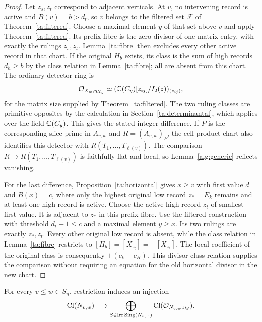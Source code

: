 \begin{proof}
Let $z_s,z_t$ correspond to adjacent verticals. At $v$, no intervening
record is active and $B(v)=b>d_t$, so $v$ belongs to
the filtered set $\mathcal F$ of Theorem~\ref{ta:filtered}. Choose a maximal element $y$ of that
set above $v$ and apply Theorem~\ref{ta:filtered}.
Its prefix fibre is the zero divisor of one matrix entry, with
exactly the rulings $z_s,z_t$. Lemma~\ref{ta:fibre} then excludes
every other active record in that chart. If the original $H_b$
exists, its class is the sum of high records $d_h\geq b$ by
the class relation in Lemma~\ref{ta:fibre}; all are absent from this chart.
The ordinary detector ring is
\[
 \mathcal O_{X_w,\eta_{X_y}}
 \simeq(\mathbb C(C_y)[z_{ij}]/I_2(z))_{(z_{ij})},
\]
for the matrix size supplied by Theorem~\ref{ta:filtered}.
The two ruling classes are primitive opposites by the calculation in
Section~\ref{ta:determinantal}, which applies over the field $\mathbb C(C_y)$.
This gives the stated integer difference. If $P$ is the corresponding
slice prime in $A_{v,w}$ and $R=(A_{v,w})_P$, the cell-product chart also
identifies this detector with $R(T_1,\ldots,T_{\ell(v)})$.
The comparison $R\to R(T_1,\ldots,T_{\ell(v)})$ is faithfully flat and local,
so Lemma~\ref{alg:generic} reflects vanishing.

For the last difference, Proposition~\ref{ta:horizontal} gives
$x\geq v$ with first value $d$ and $B(x)=c$, where only the highest
original low record $z_*=E_k$ remains and at least one high record
is active. Choose the active high record $z_t$ of smallest first
value. It is adjacent to $z_*$ in this prefix fibre.
Use the filtered construction with threshold $d_t+1\leq c$ and a
maximal element $y\geq x$. Its two rulings are exactly $z_*,z_t$.
Every other original low record is absent, while
the class relation in Lemma~\ref{ta:fibre} restricts to
$[H_b]=[X_{z_t}]=-[X_{z_*}]$. The local coefficient of the original
class is consequently $\pm(c_k-c_H)$.
This divisor-class relation supplies the comparison without requiring
an equation for the old horizontal divisor in the new chart.
\end{proof}

\begin{theorem}\label{ta:affine}
For every $v\leq w\in S_n$, restriction induces an injection
\begin{equation}\label{ta:eq:affine_injection}
 \operatorname{Cl}(N_{v,w})\longrightarrow
 \bigoplus_{S\in\operatorname{Irr}\operatorname{Sing}(N_{v,w})}
 \operatorname{Cl}(\mathcal O_{N_{v,w},\eta_S}).
\end{equation}
\end{theorem}

